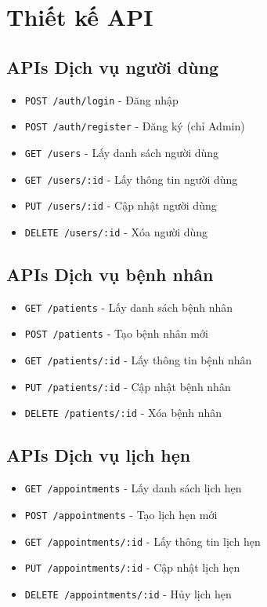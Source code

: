 \documentclass[12pt,a4paper]{report}
\begin{document}
\section{Thiết kế API}

\subsection{APIs Dịch vụ người dùng}
\begin{itemize}
    \item \texttt{POST /auth/login} - Đăng nhập
    \item \texttt{POST /auth/register} - Đăng ký (chỉ Admin)
    \item \texttt{GET /users} - Lấy danh sách người dùng
    \item \texttt{GET /users/:id} - Lấy thông tin người dùng
    \item \texttt{PUT /users/:id} - Cập nhật người dùng
    \item \texttt{DELETE /users/:id} - Xóa người dùng
\end{itemize}

\subsection{APIs Dịch vụ bệnh nhân}
\begin{itemize}
    \item \texttt{GET /patients} - Lấy danh sách bệnh nhân
    \item \texttt{POST /patients} - Tạo bệnh nhân mới
    \item \texttt{GET /patients/:id} - Lấy thông tin bệnh nhân
    \item \texttt{PUT /patients/:id} - Cập nhật bệnh nhân
    \item \texttt{DELETE /patients/:id} - Xóa bệnh nhân
\end{itemize}

\subsection{APIs Dịch vụ lịch hẹn}
\begin{itemize}
    \item \texttt{GET /appointments} - Lấy danh sách lịch hẹn
    \item \texttt{POST /appointments} - Tạo lịch hẹn mới
    \item \texttt{GET /appointments/:id} - Lấy thông tin lịch hẹn
    \item \texttt{PUT /appointments/:id} - Cập nhật lịch hẹn
    \item \texttt{DELETE /appointments/:id} - Hủy lịch hẹn
\end{itemize}
\end{document}
